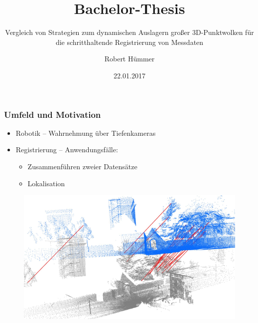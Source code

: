 \documentclass[presentation]{beamer}
\title[Bachelor-Thesis]{Bachelor-Thesis} %
\subtitle{Vergleich von Strategien zum dynamischen Auslagern großer 3D-Punktwolken für die schritthaltende Registrierung von Messdaten}
\author{Robert Hümmer} %
\institute[Fakultät für Informatik] %
{
	University of Applied Science Rosenheim \\
	\medskip
	\textit{robert.huemmer@gmail.com} %
}
\date{22.01.2017} %
\begin{document}

\maketitle %

\begin{frame}
\frametitle{Umfeld und Motivation}
%
	\begin{itemize}
		\item Robotik -- Wahrnehmung über Tiefenkameras %
		\item Registrierung -- Anwendungsfälle: 
		\begin{itemize}
			\item Zusammenführen zweier Datensätze %
			\item Lokalisation %
		\end{itemize}
	\end{itemize}
	\begin{figure} 
		\centering
		\begin{minipage}{.45\textwidth}
			\centering
			\includegraphics[width=0.90\linewidth]{figures/introduction/registration_outdoor.png}

\end{minipage}
\end{figure}
\end{frame}
\end{document}
